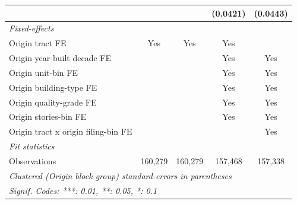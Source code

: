 \begin{tabular}{lcccc}
                                                  &                &                & (0.0421)       & (0.0443)\\   
   \midrule
   \emph{Fixed-effects}\\
   Origin tract FE                                & Yes            & Yes            & Yes            & \\  
   Origin year-built decade FE                    &                &                & Yes            & Yes\\  
   Origin unit-bin FE                             &                &                & Yes            & Yes\\  
   Origin building-type FE                        &                &                & Yes            & Yes\\  
   Origin quality-grade FE                        &                &                & Yes            & Yes\\  
   Origin stories-bin FE                          &                &                & Yes            & Yes\\  
   Origin tract x origin filing-bin FE            &                &                &                & Yes\\  
   \midrule
   \emph{Fit statistics}\\
   Observations                                   & 160,279        & 160,279        & 157,468        & 157,338\\  
   \midrule \midrule
   \multicolumn{5}{l}{\emph{Clustered (Origin block group) standard-errors in parentheses}}\\
   \multicolumn{5}{l}{\emph{Signif. Codes: ***: 0.01, **: 0.05, *: 0.1}}\\
\end{tabular}
\par\endgroup
